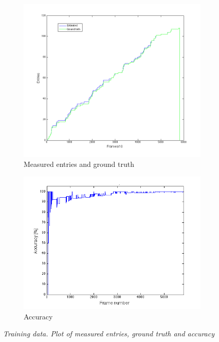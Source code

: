 \begin{figure}[H]
\centering
\begin{subfigure}{.5\textwidth}
  \centering
  \includegraphics[width=.8\linewidth]{images/EntriesTest.png}
  \caption{Measured entries and ground truth}
  \label{fig:sub1}
\end{subfigure}%
\begin{subfigure}{.5\textwidth}
  \centering
  \includegraphics[width=.8\linewidth]{images/AccEntriesTest.png}
  \caption{Accuracy}
  \label{fig:sub2}
\end{subfigure}
\caption[Entries training]{\textit{Training data. Plot of measured entries, ground truth and accuracy}}
\label{fig:Entries Training data}
\end{figure}


